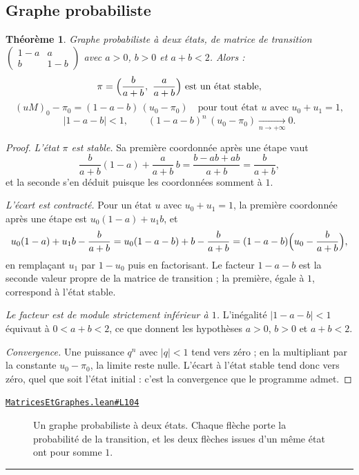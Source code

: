 \documentclass[11pt,a4paper]{article}
\theoremstyle{definition}
\theoremstyle{plain}
\newtheorem{theoreme}{Théorème}
\newcommand{\source}[2]{\par\smallskip\noindent\hfill{\footnotesize\href{#1}{\texttt{#2}}}\par\smallskip}
\begin{document}
\subsection{Graphe probabiliste}

\begin{theoreme}
Graphe probabiliste à deux états, de matrice de transition
$\begin{pmatrix} 1-a & a \\ b & 1-b \end{pmatrix}$ avec $a > 0$, $b > 0$ et $a + b < 2$.
Alors :
\[ \pi = \Bigl(\frac{b}{a+b},\ \frac{a}{a+b}\Bigr) \ \text{est un état stable} , \]
\[ (uM)_0 - \pi_0 = (1 - a - b)\,(u_0 - \pi_0) \quad
   \text{pour tout état } u \text{ avec } u_0 + u_1 = 1 , \]
\[ |1 - a - b| < 1 , \qquad (1-a-b)^{n}\,(u_0 - \pi_0) \xrightarrow[n \to +\infty]{} 0 . \]
\end{theoreme}

\begin{proof}
\emph{L'état $\pi$ est stable.} Sa première coordonnée après une étape vaut
\[ \frac{b}{a+b}(1-a) + \frac{a}{a+b}\,b
   = \frac{b - ab + ab}{a+b} = \frac{b}{a+b} , \]
et la seconde s'en déduit puisque les coordonnées somment à $1$.

\emph{L'écart est contracté.} Pour un état $u$ avec $u_0 + u_1 = 1$, la première
coordonnée après une étape est $u_0(1-a) + u_1 b$, et
\[ u_0(1-a) + u_1 b - \frac{b}{a+b}
   = u_0(1 - a - b) + b - \frac{b}{a+b}
   = (1 - a - b)\Bigl(u_0 - \frac{b}{a+b}\Bigr) , \]
en remplaçant $u_1$ par $1 - u_0$ puis en factorisant. Le facteur $1 - a - b$ est la
seconde valeur propre de la matrice de transition ; la première, égale à $1$, correspond à
l'état stable.

\emph{Le facteur est de module strictement inférieur à $1$.} L'inégalité
$|1 - a - b| < 1$ équivaut à $0 < a + b < 2$, ce que donnent les hypothèses $a > 0$,
$b > 0$ et $a + b < 2$.

\emph{Convergence.} Une puissance $q^{n}$ avec $|q| < 1$ tend vers zéro ; en la multipliant
par la constante $u_0 - \pi_0$, la limite reste nulle. L'écart à l'état stable tend donc
vers zéro, quel que soit l'état initial : c'est la convergence que le programme admet.
\end{proof}
\source{https://github.com/Commutator-IO/learn-lean/blob/main/courses/02-lycee/10-specialite-mathematiques-terminale-s/MatricesEtGraphes.lean\#L104}{MatricesEtGraphes.lean\#L104}

\begin{figure}[h]
\centering

\caption{Un graphe probabiliste à deux états. Chaque flèche porte la probabilité de la transition, et les deux flèches issues d'un même état ont pour somme $1$.}
\end{figure}

\vfill
\noindent\rule{0.35\linewidth}{0.4pt}\par
{}
\end{document}
